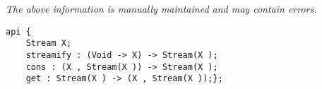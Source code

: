 \label{api:Stream}

{\tiny \it The above information is manually maintained and may contain errors.}
\begin{verbatim}
api {
    Stream X;
    streamify : (Void -> X) -> Stream(X );
    cons : (X , Stream(X )) -> Stream(X );
    get : Stream(X ) -> (X , Stream(X ));};
\end{verbatim}
